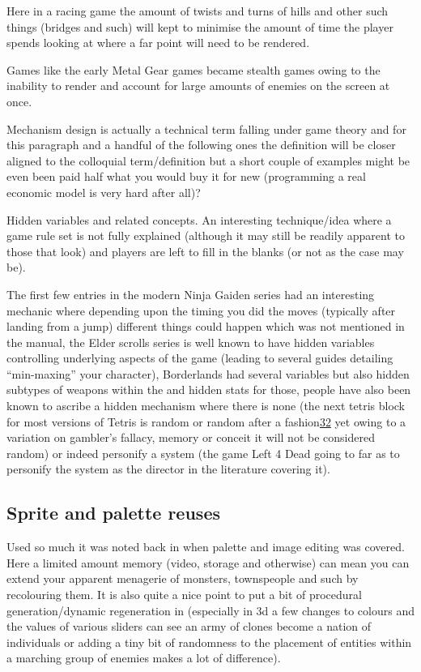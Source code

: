 \documentclass[
]{book}
\begin{document}
Here in a racing game the amount of twists and turns of hills and other such things (bridges and such) will kept to minimise the amount of time the player spends looking at where a far point will need to be rendered.

Games like the early Metal Gear games became stealth games owing to the inability to render and account for large amounts of enemies on the screen at once.

Mechanism design is actually a technical term falling under game theory and for this paragraph and a handful of the following ones the definition will be closer aligned to the colloquial term/definition but a short couple of examples might be even been paid half what you would buy it for new (programming a real economic model is very hard after all)?

Hidden variables and related concepts. An interesting technique/idea where a game rule set is not fully explained (although it may still be readily apparent to those that look) and players are left to fill in the blanks (or not as the case may be).

The first few entries in the modern Ninja Gaiden series had an interesting mechanic where depending upon the timing you did the moves (typically after landing from a jump) different things could happen which was not mentioned in the manual, the Elder scrolls series is well known to have hidden variables controlling underlying aspects of the game (leading to several guides detailing ``min-maxing'' your character), Borderlands had several variables but also hidden subtypes of weapons within the and hidden stats for those, people have also been known to ascribe a hidden mechanism where there is none (the next tetris block for most versions of Tetris is random or random after a fashion\href{romhacking202033.html\#fn32x0}{32} yet owing to a variation on gambler's fallacy, memory or conceit it will not be considered random) or indeed personify a system (the game Left 4 Dead going to far as to personify the system as the director in the literature covering it).

\hypertarget{sprite-and-palette-reuses}{%
\subsection{Sprite and palette reuses}\label{sprite-and-palette-reuses}}

Used so much it was noted back in when palette and image editing was covered. Here a limited amount memory (video, storage and otherwise) can mean you can extend your apparent menagerie of monsters, townspeople and such by recolouring them. It is also quite a nice point to put a bit of procedural generation/dynamic regeneration in (especially in 3d a few changes to colours and the values of various sliders can see an army of clones become a nation of individuals or adding a tiny bit of randomness to the placement of entities within a marching group of enemies makes a lot of difference).
\end{document}

